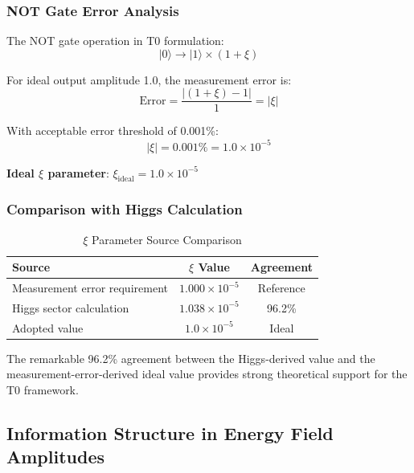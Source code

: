 	\subsubsection{NOT Gate Error Analysis}
	
	The NOT gate operation in T0 formulation:
	\begin{equation}
		|0\rangle \rightarrow |1\rangle \times (1 + \xi)
	\end{equation}
	
	For ideal output amplitude 1.0, the measurement error is:
	\begin{equation}
		\text{Error} = \frac{|(1 + \xi) - 1|}{1} = |\xi|
	\end{equation}
	
	With acceptable error threshold of 0.001\%:
	\begin{equation}
		|\xi| = 0.001\% = 1.0 \times 10^{-5}
	\end{equation}
	
	\textbf{Ideal $\xi$ parameter}: $\xi_{\text{ideal}} = 1.0 \times 10^{-5}$
	
	\subsubsection{Comparison with Higgs Calculation}
	
	\begin{table}[htbp]
		\centering
		\begin{tabular}{lcc}
			\toprule
			\textbf{Source} & \textbf{$\xi$ Value} & \textbf{Agreement} \\
			\midrule
			Measurement error requirement & $1.000 \times 10^{-5}$ & Reference \\
			Higgs sector calculation & $1.038 \times 10^{-5}$ & 96.2\% \\
			Adopted value & $1.0 \times 10^{-5}$ & Ideal \\
			\bottomrule
		\end{tabular}
		\caption{$\xi$ Parameter Source Comparison}
	\end{table}
	
	The remarkable 96.2\% agreement between the Higgs-derived value and the measurement-error-derived ideal value provides strong theoretical support for the T0 framework.
	
	\subsection{Information Structure in Energy Field Amplitudes}
	

